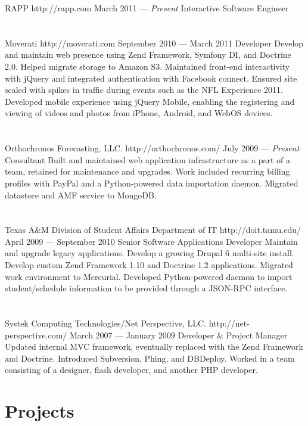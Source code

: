 \documentclass{resume}
\begin{document}
\employer
	{RAPP}
	{http://rapp.com}
	{March 2011 --- \emph{Present}}
	{Interactive Software Engineer}
	{}
\\ \\ \\
\employer
	{Moverati}
	{http://moverati.com}
	{September 2010 --- March 2011}
	{Developer}
	{Develop and maintain web presence using Zend Framework, Symfony DI, and Doctrine 2.0. Helped migrate storage to Amazon S3. Maintained front-end interactivity with jQuery and integrated authentication with Facebook connect. Ensured site scaled with spikes in traffic during events such as the NFL Experience 2011. Developed mobile experience using jQuery Mobile, enabling the registering and viewing of videos and photos from iPhone, Android, and WebOS devices.}
\\ \\ \\
\employer
	{Orthochronos Forecasting, LLC.}
	{http://orthochronos.com/}
	{July 2009 --- \emph{Present}}
	{Consultant}
	{Built and maintained web application infrastructure as a part of a team, retained for maintenance and upgrades. Work included recurring billing profiles with PayPal and a Python-powered data importation daemon. Migrated datastore and AMF service to MongoDB.}
\\ \\ \\
\employer
	{Texas A\&M Division of Student Affairs Department of IT}
	{http://doit.tamu.edu/}
	{April 2009 --- September 2010}
	{Senior Software Applications Developer}
	{Maintain and upgrade legacy applications. Develop a growing Drupal 6 multi-site install. Develop custom Zend Framework 1.10 and Doctrine 1.2 applications. Migrated work environment to Mercurial. Developed Python-powered daemon to import student/schedule information to be provided through a JSON-RPC interface.}
\\ \\ \\
\employer
	{Systek Computing Technologies/Net Perspective, LLC.}
	{http://net-perspective.com/}
	{March 2007 --- January 2009}
	{Developer \& Project Manager}
	{Updated internal MVC framework, eventually replaced with the Zend Framework and Doctrine. Introduced Subversion, Phing, and DBDeploy. Worked in a team consisting of a designer, flash developer, and another PHP developer.}

\section{Projects}
\end{document}
